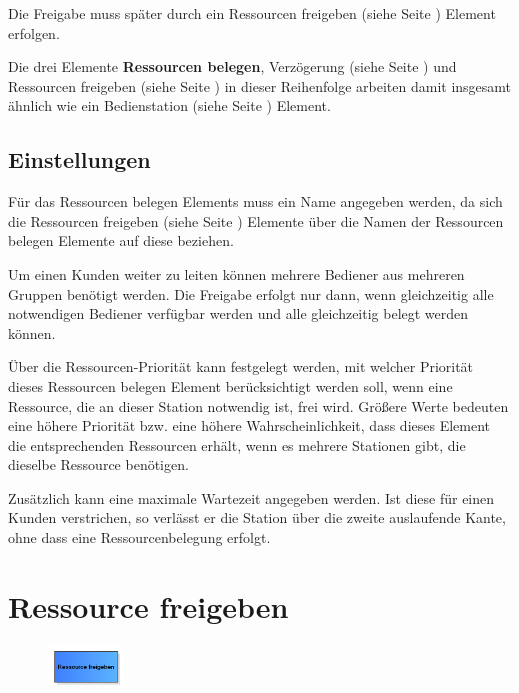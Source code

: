 Die Freigabe muss später durch ein Ressourcen freigeben (siehe Seite \pageref{ref:ModelElementRelease}) Element erfolgen.

Die drei Elemente \textbf{Ressourcen belegen}, Verzögerung (siehe Seite \pageref{ref:ModelElementDelay}) und
Ressourcen freigeben (siehe Seite \pageref{ref:ModelElementRelease}) in dieser Reihenfolge arbeiten damit
insgesamt ähnlich wie ein Bedienstation (siehe Seite \pageref{ref:ModelElementProcess}) Element.

\subsection*{Einstellungen}

Für das Ressourcen belegen Elements muss ein Name angegeben werden, da sich die
Ressourcen freigeben (siehe Seite \pageref{ref:ModelElementRelease}) Elemente über die Namen
der Ressourcen belegen Elemente auf diese beziehen.

Um einen Kunden weiter zu leiten können mehrere Bediener aus mehreren Gruppen benötigt werden. Die Freigabe erfolgt
nur dann, wenn gleichzeitig alle notwendigen Bediener verfügbar werden und alle gleichzeitig belegt werden können.

Über die Ressourcen-Priorität kann festgelegt werden, mit welcher Priorität dieses Ressourcen belegen Element
berücksichtigt werden soll, wenn eine Ressource, die an dieser Station notwendig ist,
frei wird. Größere Werte bedeuten eine höhere Priorität bzw. eine höhere Wahrscheinlichkeit, dass dieses Element
die entsprechenden Ressourcen erhält, wenn es mehrere Stationen gibt, die dieselbe Ressource benötigen.

Zusätzlich kann eine maximale Wartezeit angegeben werden. Ist diese für einen Kunden verstrichen,
so verlässt er die Station über die zweite auslaufende Kante, ohne dass eine Ressourcenbelegung erfolgt.


\section{Ressource freigeben}
\label{ref:ModelElementRelease}

\begin{figure}
\vspace{-22pt}
\includegraphics[width=2cm]{imageModelElementRelease.png}
\vspace{-22pt}
\end{figure}

